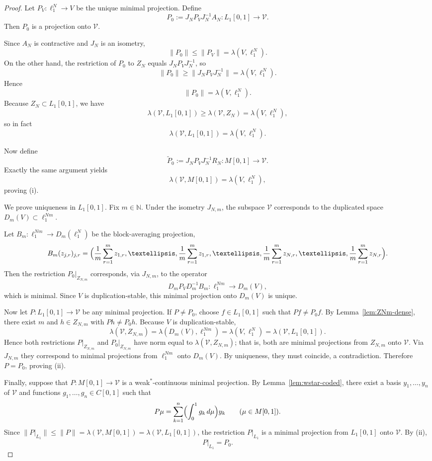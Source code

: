 \documentclass[10pt,a4paper]{amsart}
\newcommand{\N}{\mathbb N}
\begin{document}
\begin{proof}
Let $P_V\colon \ell_1^N\to V$ be the unique minimal projection. Define
\[
P_0 := J_N P_V J_N^{-1} A_N\colon L_1[0,1]\to \mathscr V.
\]
Then $P_0$ is a projection onto $\mathscr V$.

Since $A_N$ is contractive and $J_N$ is an isometry,
\[
\|P_0\|\leqslant \|P_V\| = \lambda(V,\ell_1^N).
\]
On the other hand, the restriction of $P_0$ to $Z_N$ equals $J_NP_VJ_N^{-1}$, so
\[
\|P_0\|\geqslant \|J_NP_VJ_N^{-1}\| = \lambda(V,\ell_1^N).
\]
Hence
\[
\|P_0\| = \lambda(V,\ell_1^N).
\]
Because $Z_N\subset L_1[0,1]$, we have
\[
\lambda(\mathscr V,L_1[0,1]) \geqslant \lambda(\mathscr V,Z_N)=\lambda(V,\ell_1^N),
\]
so in fact
\[
\lambda(\mathscr V,L_1[0,1]) = \lambda(V,\ell_1^N).
\]

Now define
\[
\widetilde P_0 := J_N P_V J_N^{-1} R_N\colon M[0,1]\to \mathscr V.
\]
Exactly the same argument yields
\[
\lambda(\mathscr V,M[0,1]) = \lambda(V,\ell_1^N),
\]
proving \textup{(i)}.

We prove uniqueness in $L_1[0,1]$. Fix $m\in\N$. Under the isometry $J_{N,m}$, the subspace $\mathscr V$ corresponds to the duplicated space $D_m(V)\subset \ell_1^{Nm}$.

Let $B_m\colon \ell_1^{Nm}\to D_m(\ell_1^N)$ be the block-averaging projection,
\[
B_m(z_{j,r})_{j,r} = \Bigl(\frac1m\sum_{r=1}^m z_{1,r},\dots,\frac1m\sum_{r=1}^m z_{1,r},\dots,
\frac1m\sum_{r=1}^m z_{N,r},\dots,\frac1m\sum_{r=1}^m z_{N,r}\Bigr).
\]
Then the restriction $P_0|_{Z_{N,m}}$ corresponds, via $J_{N,m}$, to the operator
\[
D_m P_V D_m^{-1} B_m\colon \ell_1^{Nm}\to D_m(V),
\]
which is minimal. Since $V$ is duplication-stable, this minimal projection onto $D_m(V)$ is unique.

Now let $P\colon L_1[0,1]\to \mathscr V$ be any minimal projection. If $P\neq P_0$, choose $f\in L_1[0,1]$ such that $Pf\neq P_0f$. By Lemma~\ref{lem:ZNm-dense}, there exist $m$ and $h\in Z_{N,m}$ with $Ph\neq P_0h$. Because $V$ is duplication-stable,
\[
\lambda(\mathscr V,Z_{N,m}) = \lambda(D_m(V),\ell_1^{Nm}) = \lambda(V,\ell_1^N)=\lambda(\mathscr V,L_1[0,1]).
\]
Hence both restrictions $P|_{Z_{N,m}}$ and $P_0|_{Z_{N,m}}$ have norm equal to $\lambda(\mathscr V,Z_{N,m})$; that is, both are minimal projections from $Z_{N,m}$ onto $\mathscr V$. Via $J_{N,m}$ they correspond to minimal projections from $\ell_1^{Nm}$ onto $D_m(V)$. By uniqueness, they must coincide, a contradiction. Therefore $P=P_0$, proving \textup{(ii)}.

Finally, suppose that $P\colon M[0,1]\to \mathscr V$ is a weak$^*$-continuous minimal projection. By Lemma~\ref{lem:wstar-coded}, there exist a basis $y_1,\dots,y_n$ of $\mathscr V$ and functions $g_1,\dots,g_n\in C[0,1]$ such that
\[
P\mu = \sum_{k=1}^n \Bigl(\int_0^1 g_k\, d\mu\Bigr) y_k
\qquad (\mu\in M[0,1]).
\]
Since $\|P|_{L_1}\|\leqslant \|P\| = \lambda(\mathscr V,M[0,1]) = \lambda(\mathscr V,L_1[0,1])$, the restriction $P|_{L_1}$ is a minimal projection from $L_1[0,1]$ onto $\mathscr V$. By \textup{(ii)},
\[
P|_{L_1} = P_0.
\]


\end{proof}
\end{document}
